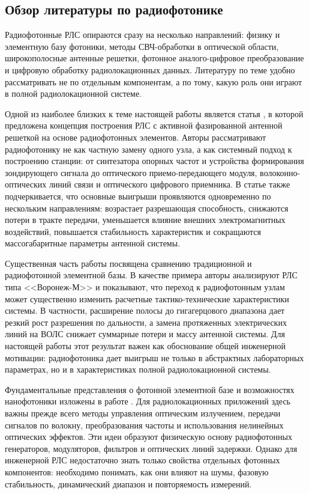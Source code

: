 \subsection{Обзор литературы по радиофотонике}

Радиофотонные РЛС опираются сразу на несколько направлений: физику и элементную
базу фотоники, методы СВЧ-обработки в оптической области, широкополосные
антенные решетки, фотонное аналого-цифровое преобразование и цифровую обработку
радиолокационных данных. Литературу по теме удобно рассматривать не по отдельным
компонентам, а по тому, какую роль они играют в полной радиолокационной системе.

Одной из наиболее близких к теме настоящей работы является статья
\cite{shumov2016concept}, в которой предложена концепция построения РЛС с активной
фазированной антенной решеткой на основе радиофотонных элементов. Авторы
рассматривают радиофотонику не как частную замену одного узла, а как системный
подход к построению станции: от синтезатора опорных частот и устройства формирования
зондирующего сигнала до оптического приемо-передающего модуля, волоконно-оптических
линий связи и оптического цифрового приемника. В статье также подчеркивается, что
основные выигрыши проявляются одновременно по нескольким направлениям: возрастает
разрешающая способность, снижаются потери в тракте передачи, уменьшается влияние
внешних электромагнитных воздействий, повышается стабильность характеристик и
сокращаются массогабаритные параметры антенной системы.

Существенная часть работы \cite{shumov2016concept} посвящена сравнению
традиционной и радиофотонной элементной базы. В качестве примера авторы анализируют
РЛС типа <<Воронеж-М>> и показывают, что переход к радиофотонным узлам может
существенно изменить расчетные тактико-технические характеристики системы. В
частности, расширение полосы до гигагерцового диапазона дает резкий рост разрешения
по дальности, а замена протяженных электрических линий на ВОЛС снижает суммарные
потери и массу антенной системы. Для настоящей работы этот результат важен как
обоснование общей инженерной мотивации: радиофотоника дает выигрыш не только в
абстрактных лабораторных параметрах, но и в характеристиках полной радиолокационной
системы.

Фундаментальные представления о фотонной элементной базе и возможностях
нанофотоники изложены в работе \cite{zaitsev2012nanophotonics}. Для радиолокационных
приложений здесь важны прежде всего методы управления оптическим излучением,
передачи сигналов по волокну, преобразования частоты и использования нелинейных
оптических эффектов. Эти идеи образуют физическую основу радиофотонных генераторов,
модуляторов, фильтров и оптических линий задержки. Однако для инженерной РЛС
недостаточно знать только свойства отдельных фотонных компонентов: необходимо
понимать, как они влияют на шумы, фазовую стабильность, динамический диапазон и
повторяемость измерений.


